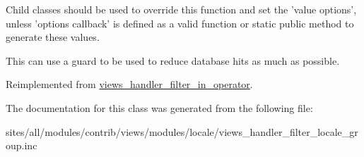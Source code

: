 Child classes should be used to override this function and set the 'value options', unless 'options callback' is defined as a valid function or static public method to generate these values.

This can use a guard to be used to reduce database hits as much as possible. 

Reimplemented from \hyperlink{classviews__handler__filter__in__operator_a5b5df6d90f4359ed28c0c446bdc81a6}{views\_\-handler\_\-filter\_\-in\_\-operator}.

The documentation for this class was generated from the following file:\begin{CompactItemize}
\item 
sites/all/modules/contrib/views/modules/locale/views\_\-handler\_\-filter\_\-locale\_\-group.inc\end{CompactItemize}
